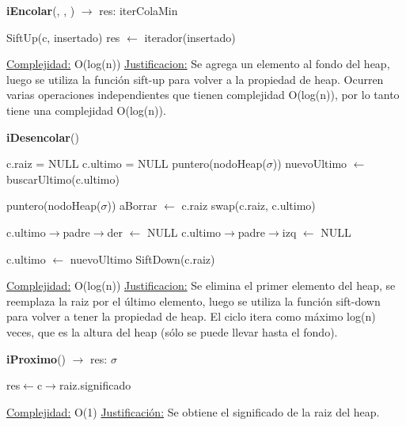 \begin{Representacion}
\begin{Algoritmos}
\begin{algorithm}[H]{\textbf{iEncolar}(, , ) $\to$ res: iterColaMin}
\begin{algorithmic}[1]
		\State SiftUp(c, insertado)
		\State res $\gets$ iterador(insertado)
		
		
		\medskip
		\Statex \underline{Complejidad:} O(log(n))
			\Statex \underline{Justificacion:} Se agrega un elemento al fondo del heap, luego se utiliza la función sift-up para volver a la propiedad de heap. Ocurren varias operaciones independientes que tienen complejidad O(log(n)), por lo tanto tiene una complejidad O(log(n)).
	\end{algorithmic}
\end{algorithm}


\begin{algorithm}[H]{\textbf{iDesencolar}(})
	\begin{algorithmic}[1]

			\State c.raiz = NULL
			\State c.ultimo = NULL
		\Else	
			\State puntero(nodoHeap($\sigma$)) nuevoUltimo $\gets$ buscarUltimo(c.ultimo)

			\State puntero(nodoHeap($\sigma$)) aBorrar $\gets$ c.raiz
			\State swap(c.raiz, c.ultimo)
		
				\State c.ultimo$\to$padre$\to$der $\gets$ NULL
			\Else
				\State c.ultimo$\to$padre$\to$izq $\gets$ NULL
			\EndIf
		
		\State c.ultimo $\gets$ nuevoUltimo
		\State SiftDown(c.raiz)

		\EndIf	

		
		\medskip
		\Statex \underline{Complejidad:} O(log(n))
			\Statex \underline{Justificacion:} Se elimina el primer elemento del heap, se reemplaza la raiz por el último elemento, luego se utiliza la función sift-down para volver a tener la propiedad de heap. El ciclo itera como máximo log(n) veces, que es la altura del heap (sólo se puede llevar hasta el fondo).  
	\end{algorithmic}
\end{algorithm}


\begin{algorithm}[H]{\textbf{iProximo}() $\to$ res: $\sigma$}
	\begin{algorithmic}[1]
		
		\State res$\leftarrow$c$\rightarrow$raiz.significado
		
		\medskip
		\Statex \underline{Complejidad:} O(1)
			\Statex \underline{Justificación:} Se obtiene el significado de la raiz del heap.
	\end{algorithmic}
\end{algorithm}



\end{Algoritmos}
\end{Representacion}
